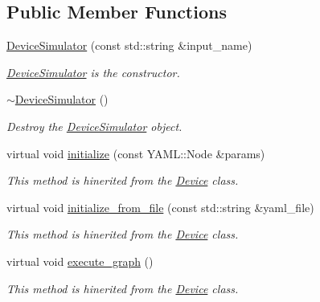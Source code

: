\subsection*{Public Member Functions}
\begin{DoxyCompactItemize}
\item 
\hyperlink{classdynamic__graph_1_1DeviceSimulator_ad1c52d0a4bfa4617c7653532570a2c90}{Device\+Simulator} (const std\+::string \&input\+\_\+name)
\begin{DoxyCompactList}\small\item\em \hyperlink{classdynamic__graph_1_1DeviceSimulator}{Device\+Simulator} is the constructor. \end{DoxyCompactList}\item 
\mbox{\label{classdynamic__graph_1_1DeviceSimulator_a7510771e215f2f20f05a5d4193dc4f76}} 
\hyperlink{classdynamic__graph_1_1DeviceSimulator_a7510771e215f2f20f05a5d4193dc4f76}{$\sim$\+Device\+Simulator} ()
\begin{DoxyCompactList}\small\item\em Destroy the \hyperlink{classdynamic__graph_1_1DeviceSimulator}{Device\+Simulator} object. \end{DoxyCompactList}\item 
virtual void \hyperlink{classdynamic__graph_1_1DeviceSimulator_a346995902653feca7707f8c62ab4bf95}{initialize} (const Y\+A\+M\+L\+::\+Node \&params)
\begin{DoxyCompactList}\small\item\em This method is hinerited from the \hyperlink{classdynamic__graph_1_1Device}{Device} class. \end{DoxyCompactList}\item 
virtual void \hyperlink{classdynamic__graph_1_1DeviceSimulator_a8a9370f236ba03162be2472c79f865f2}{initialize\+\_\+from\+\_\+file} (const std\+::string \&yaml\+\_\+file)
\begin{DoxyCompactList}\small\item\em This method is hinerited from the \hyperlink{classdynamic__graph_1_1Device}{Device} class. \end{DoxyCompactList}\item 
virtual void \hyperlink{classdynamic__graph_1_1DeviceSimulator_a614c51ee8d55765019ae98715f875ed5}{execute\+\_\+graph} ()
\begin{DoxyCompactList}\small\item\em This method is hinerited from the \hyperlink{classdynamic__graph_1_1Device}{Device} class. \end{DoxyCompactList}\end{DoxyCompactItemize}
